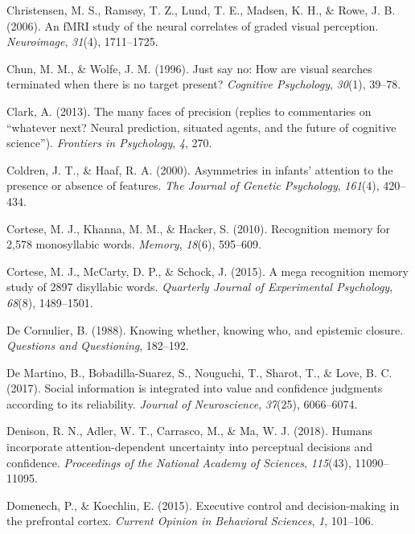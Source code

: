 \documentclass[12pt,twoside]{reedthesis}
\begin{document}
\leavevmode\hypertarget{ref-christensen2006fmri}{}%
Christensen, M. S., Ramsøy, T. Z., Lund, T. E., Madsen, K. H., \& Rowe, J. B. (2006). An fMRI study of the neural correlates of graded visual perception. \emph{Neuroimage}, \emph{31}(4), 1711--1725.

\leavevmode\hypertarget{ref-chun1996just}{}%
Chun, M. M., \& Wolfe, J. M. (1996). Just say no: How are visual searches terminated when there is no target present? \emph{Cognitive Psychology}, \emph{30}(1), 39--78.

\leavevmode\hypertarget{ref-clark2013many}{}%
Clark, A. (2013). The many faces of precision (replies to commentaries on ``whatever next? Neural prediction, situated agents, and the future of cognitive science''). \emph{Frontiers in Psychology}, \emph{4}, 270.

\leavevmode\hypertarget{ref-coldren2000asymmetries}{}%
Coldren, J. T., \& Haaf, R. A. (2000). Asymmetries in infants' attention to the presence or absence of features. \emph{The Journal of Genetic Psychology}, \emph{161}(4), 420--434.

\leavevmode\hypertarget{ref-cortese2010recognition}{}%
Cortese, M. J., Khanna, M. M., \& Hacker, S. (2010). Recognition memory for 2,578 monosyllabic words. \emph{Memory}, \emph{18}(6), 595--609.

\leavevmode\hypertarget{ref-cortese2015mega}{}%
Cortese, M. J., McCarty, D. P., \& Schock, J. (2015). A mega recognition memory study of 2897 disyllabic words. \emph{Quarterly Journal of Experimental Psychology}, \emph{68}(8), 1489--1501.

\leavevmode\hypertarget{ref-de1988knowing}{}%
De Cornulier, B. (1988). Knowing whether, knowing who, and epistemic closure. \emph{Questions and Questioning}, 182--192.

\leavevmode\hypertarget{ref-de2017social}{}%
De Martino, B., Bobadilla-Suarez, S., Nouguchi, T., Sharot, T., \& Love, B. C. (2017). Social information is integrated into value and confidence judgments according to its reliability. \emph{Journal of Neuroscience}, \emph{37}(25), 6066--6074.

\leavevmode\hypertarget{ref-denison2018humans}{}%
Denison, R. N., Adler, W. T., Carrasco, M., \& Ma, W. J. (2018). Humans incorporate attention-dependent uncertainty into perceptual decisions and confidence. \emph{Proceedings of the National Academy of Sciences}, \emph{115}(43), 11090--11095.

\leavevmode\hypertarget{ref-domenech2015executive}{}%
Domenech, P., \& Koechlin, E. (2015). Executive control and decision-making in the prefrontal cortex. \emph{Current Opinion in Behavioral Sciences}, \emph{1}, 101--106.
\end{document}
